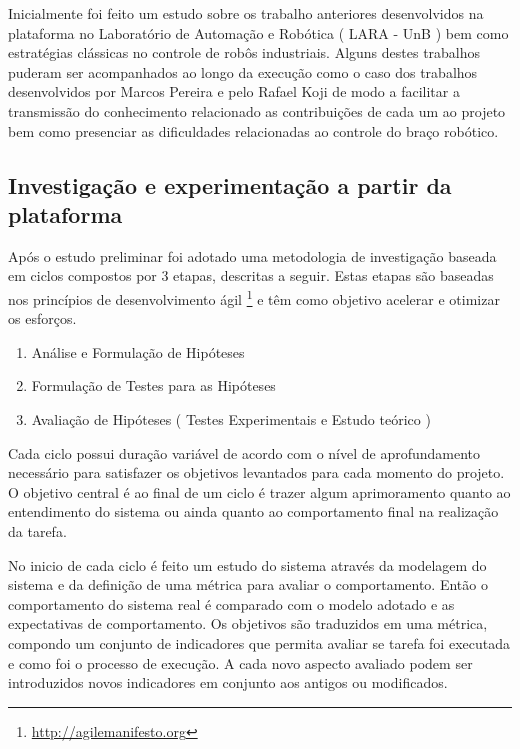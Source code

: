 Inicialmente foi feito um estudo sobre os trabalho anteriores desenvolvidos na plataforma no Laboratório de Automação e Robótica ( LARA - UnB ) bem como estratégias clássicas no controle de robôs industriais. Alguns destes trabalhos puderam ser acompanhados ao longo da execução como o caso dos trabalhos desenvolvidos por Marcos Pereira \cite{marcosps2016} e pelo Rafael Koji \cite{koji2017} de modo a facilitar a transmissão do conhecimento relacionado as contribuições de cada um ao projeto bem como presenciar as dificuldades relacionadas ao controle do braço robótico.

\subsection{Investigação e experimentação a partir da plataforma}

Após o estudo preliminar foi adotado uma metodologia de investigação baseada em ciclos compostos por 3 etapas, descritas a seguir. Estas etapas são baseadas nos princípios de desenvolvimento ágil \footnote{\url{http://agilemanifesto.org}} e têm como objetivo acelerar e otimizar os esforços.


\begin{enumerate}
    \item Análise e Formulação de Hipóteses
    \item Formulação de Testes para as Hipóteses
    \item Avaliação de Hipóteses ( Testes Experimentais e Estudo teórico )
\end{enumerate}

Cada ciclo possui duração variável de acordo com o nível de aprofundamento necessário para satisfazer os objetivos levantados para cada momento do projeto. O objetivo central é ao final de um ciclo é trazer algum aprimoramento quanto ao entendimento do sistema ou ainda quanto ao comportamento final na realização da tarefa.

No inicio de cada ciclo é feito um estudo do sistema através da modelagem do sistema e da definição de uma métrica para avaliar o comportamento. Então o comportamento do sistema real é comparado com o modelo adotado e as expectativas de comportamento. Os objetivos são traduzidos em uma métrica, compondo um conjunto de indicadores que permita avaliar se tarefa foi executada e como foi o processo de execução. A cada novo aspecto avaliado podem ser introduzidos novos indicadores em conjunto aos antigos ou modificados. 

